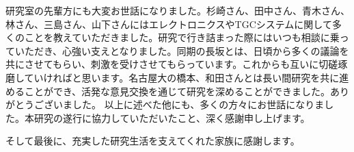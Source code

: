 研究室の先輩方にも大変お世話になりました。杉崎さん、田中さん、青木さん、林さん、三島さん、山下さんにはエレクトロニクスやTGCシステムに関して多くのことを教えていただきました。研究で行き詰まった際にはいつも相談に乗っていただき、心強い支えとなりました。同期の長坂とは、日頃から多くの議論を共にさせてもらい、刺激を受けさせてもらっています。これからも互いに切磋琢磨していければと思います。名古屋大の橋本、和田さんとは長い間研究を共に進めることができ、活発な意見交換を通じて研究を深めることができました。ありがとうございました。
以上に述べた他にも、多くの方々にお世話になりました。本研究の遂行に協力していただいたこと、深く感謝申し上げます。

そして最後に、充実した研究生活を支えてくれた家族に感謝します。

